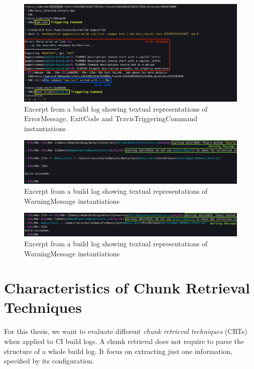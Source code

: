 \documentclass[\myrootdir/main.tex]{subfiles}
\begin{document}
\begin{figure}[htbp]
	\centering
	\includegraphics[width=\textwidth, clip]{img/log3.png}
	\caption{Excerpt from a build log showing textual representations of ErrorMessage, ExitCode and TravisTriggeringCommand instantiations}
	\label{fig:log-3}
\end{figure}
\begin{figure}[htbp]
	\centering
	\includegraphics[width=\textwidth, clip]{img/log4.png}
	\caption{Excerpt from a build log showing textual representations of WarningMessage instantiations}
	\label{fig:log-4}
\end{figure}
\begin{figure}[htbp]
	\centering
	\includegraphics[width=\textwidth, clip]{img/log5.png}
	\caption{Excerpt from a build log showing textual representations of WarningMessage instantiations}
	\label{fig:log-5}
\end{figure}


\section{Characteristics of Chunk Retrieval Techniques}
\label{sec:blirt}
For this thesis, we want to evaluate different \emph{chunk retrieval techniques} (CRTs) when applied to CI build logs.
A chunk retrieval does not require to parse the structure of a whole build log.
It focus on extracting just one information, specified by its configuration.
\end{document}
